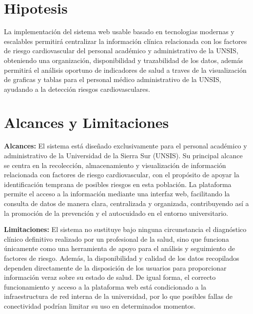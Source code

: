 \section{Hipotesis}
    La implementación del sistema web usable basado en tecnologias modernas y escalables permitirá centralizar la información clínica relacionada con los factores de riesgo cardiovascular del personal académico y administrativo de la UNSIS, obteniendo una organización, disponibilidad y trazabilidad de los datos, además permitirá el análisis oportuno de indicadores de salud a traves de la visualización de graficas y tablas para el personal médico administrativo de la UNSIS, ayudando a la detección riesgos cardiovasculares.

\section{Alcances y Limitaciones}

        \textbf{Alcances:} 
        El sistema está diseñado exclusivamente para el personal académico y administrativo de la Universidad de la Sierra Sur (UNSIS). Su principal alcance se centra en la recolección, almacenamiento y visualización de información relacionada con factores de riesgo cardiovascular, con el propósito de apoyar la identificación temprana de posibles riesgos en esta población. La plataforma permite el acceso a la información mediante una interfaz web, facilitando la consulta de datos de manera clara, centralizada y organizada, contribuyendo así a la promoción de la prevención y el autocuidado en el entorno universitario.
        
        \textbf{Limitaciones:} 
        El sistema no sustituye bajo ninguna circunstancia el diagnóstico clínico definitivo realizado por un profesional de la salud, sino que funciona únicamente como una herramienta de apoyo para el análisis y seguimiento de factores de riesgo. Además, la disponibilidad y calidad de los datos recopilados dependen directamente de la disposición de los usuarios para proporcionar información veraz sobre su estado de salud. De igual forma, el correcto funcionamiento y acceso a la plataforma web está condicionado a la infraestructura de red interna de la universidad, por lo que posibles fallas de conectividad podrían limitar su uso en determinados momentos.

